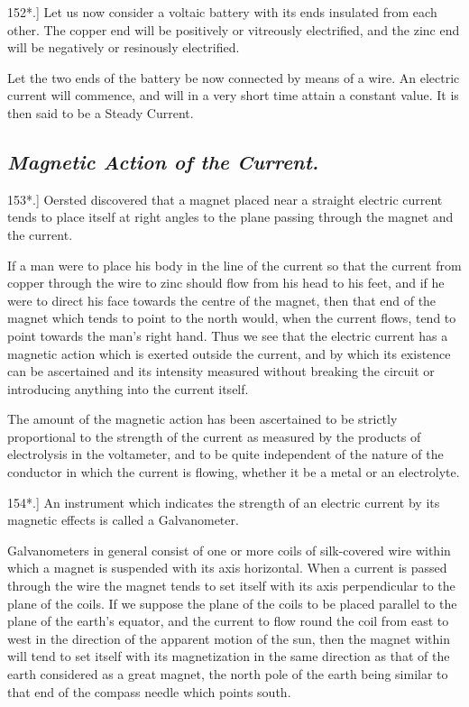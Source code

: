 \documentclass[12pt,oneside]{book}[2021/10/04]
\newcommand{\Heading}{\centering\normalfont}
\newcommand{\Subsection}[1]{\subsection*{\normalsize\Heading\itshape #1}}
\newcommand{\Runhead}[1]{\fancyhead[C]{\iffloatpage{}{\small#1}}}
\newcommand{\article}[1]{\phantomsection \label{art:#1}{#1.]}}
\newcommand{\¬}{\hphantom{0}}
\begin{document}
\article{152*} Let us now consider a voltaic battery with its ends insulated
from each other. The copper end will be positively or
vitreously electrified, and the zinc end will be negatively or resinously
electrified.

Let the two ends of the battery be now connected by means
of a wire. An electric current will commence, and will in a very
short time attain a constant value. It is then said to be a Steady
Current.

\Subsection{Magnetic Action of the Current.}

\article{153*} Oersted discovered that a magnet placed near a straight
electric current tends to place itself at right angles to the plane
passing through the magnet and the current.
\Runhead{OERSTED'S DISCOVERY.}

If a man were to place his body in the line of the current so
that the current from copper through the wire to zinc should flow
from his head to his feet, and if he were to direct his face towards
the centre of the magnet, then that end of the magnet which tends
to point to the north would, when the current flows, tend to point
towards the man's right hand. Thus we see that the electric
current has a magnetic action which is exerted outside the current,
and by which its existence can be ascertained and its intensity
measured without breaking the circuit or introducing anything
into the current itself.

The amount of the magnetic action has been ascertained to be
strictly proportional to the strength of the current as measured
by the products of electrolysis in the voltameter, and to be quite
independent of the nature of the conductor in which the current
is flowing, whether it be a metal or an electrolyte.

\article{154*} An instrument which indicates the strength of an electric
current by its magnetic effects is called a Galvanometer.

Galvanometers in general consist of one or more coils of silk-covered
wire within which a magnet is suspended with its axis
horizontal. When a current is passed through the wire the magnet
tends to set itself with its axis perpendicular to the plane of the
coils. If we suppose the plane of the coils to be placed parallel
to the plane of the earth's equator, and the current to flow round
the coil from east to west in the direction of the apparent motion
of the sun, then the magnet within will tend to set itself with
its magnetization in the same direction as that of the earth considered
as a great magnet, the north pole of the earth being similar
to that end of the compass needle which points south.
\end{document}
